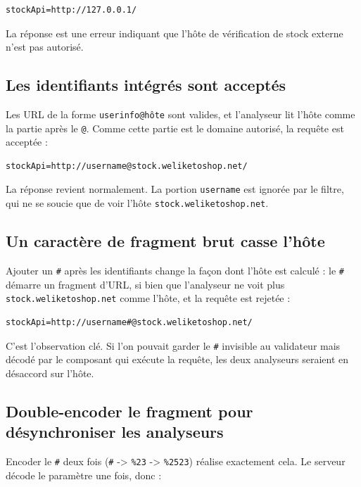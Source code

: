 \documentclass[11pt,a4paper]{article}
\begin{document}
\begin{lstlisting}
stockApi=http://127.0.0.1/
\end{lstlisting}

La réponse est une erreur indiquant que l'hôte de vérification de stock externe
n'est pas autorisé.


\subsection{Les identifiants intégrés sont acceptés}
Les URL de la forme \texttt{userinfo@hôte} sont valides, et l'analyseur lit
l'hôte comme la partie après le \texttt{@}. Comme cette partie est le domaine
autorisé, la requête est acceptée :

\begin{lstlisting}
stockApi=http://username@stock.weliketoshop.net/
\end{lstlisting}

La réponse revient normalement. La portion \texttt{username} est ignorée par le
filtre, qui ne se soucie que de voir l'hôte \texttt{stock.weliketoshop.net}.


\subsection{Un caractère de fragment brut casse l'hôte}
Ajouter un \texttt{\#} après les identifiants change la façon dont l'hôte est
calculé : le \texttt{\#} démarre un fragment d'URL, si bien que l'analyseur ne
voit plus \texttt{stock.weliketoshop.net} comme l'hôte, et la requête est
rejetée :

\begin{lstlisting}
stockApi=http://username#@stock.weliketoshop.net/
\end{lstlisting}


C'est l'observation clé. Si l'on pouvait garder le \texttt{\#} invisible au
validateur mais décodé par le composant qui exécute la requête, les deux
analyseurs seraient en désaccord sur l'hôte.

\subsection{Double-encoder le fragment pour désynchroniser les analyseurs}
Encoder le \texttt{\#} deux fois (\texttt{\#} -> \texttt{\%23}
-> \texttt{\%2523}) réalise exactement cela. Le serveur décode le
paramètre une fois, donc :
\end{document}
